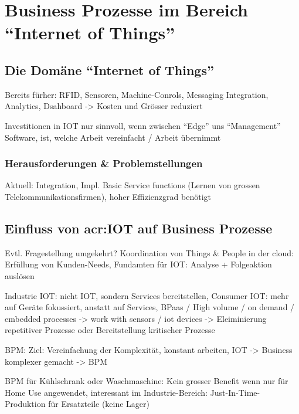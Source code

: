 
\chapter{Business Prozesse im Bereich "`Internet of Things"'}

\section{Die Domäne "`Internet of Things"'}

Bereits fürher: RFID, Sensoren, Machine-Conrols, Messaging Integration, Analytics, Dsahboard -> Kosten und Grösser reduziert

Investitionen in IOT nur sinnvoll, wenn zwischen "`Edge"' uns "`Management"' Software, ist, welche Arbeit vereinfacht / Arbeit übernimmt

\subsection{Herausforderungen \& Problemstellungen}

Aktuell: Integration, Impl. Basic Service functions (Lernen von grossen Telekommunikationsfirmen), hoher Effizienzgrad benötigt

\section{Einfluss von \gls{acr:IOT} auf Business Prozesse}

Evtl. Fragestellung umgekehrt? 
Koordination von Things \& People in der cloud: Erfüllung von Kunden-Needs, Fundamten für IOT: Analyse + Folgeaktion auslösen

	Industrie IOT: nicht IOT, sondern Services bereitstellen, Consumer IOT: mehr auf Geräte fokussiert, anstatt auf Services, BPaas / High volume / on demand / embedded processes -> work with sensors / iot devices -> Eleiminierung repetitiver Prozesse oder Bereitstellung kritischer Prozesse

BPM: Ziel: Vereinfachung der Komplexität, konstant arbeiten, IOT -> Business komplexer gemacht -> BPM

BPM für Kühlschrank oder Waschmaschine: Kein grosser Benefit wenn nur für Home Use angewendet, interessant im Industrie-Bereich: Just-In-Time-Produktion für Ersatzteile (keine Lager)

